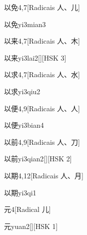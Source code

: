 \begin{entry}{以免}{4,7}[Radicais ⼈、⼉]
  \begin{phonetics}{以免}{yi3mian3}
  \end{phonetics}
\end{entry}

\begin{entry}{以来}{4,7}[Radicais ⼈、⽊]
  \begin{phonetics}{以来}{yi3lai2}[][HSK 3]
  \end{phonetics}
\end{entry}

\begin{entry}{以求}{4,7}[Radicais ⼈、⽔]
  \begin{phonetics}{以求}{yi3qiu2}
  \end{phonetics}
\end{entry}

\begin{entry}{以便}{4,9}[Radicais ⼈、⼈]
  \begin{phonetics}{以便}{yi3bian4}
  \end{phonetics}
\end{entry}

\begin{entry}{以前}{4,9}[Radicais ⼈、⼑]
  \begin{phonetics}{以前}{yi3qian2}[][HSK 2]
  \end{phonetics}
\end{entry}

\begin{entry}{以期}{4,12}[Radicais ⼈、⽉]
  \begin{phonetics}{以期}{yi3qi1}
  \end{phonetics}
\end{entry}

\begin{entry}{元}{4}[Radical ⼉]
  \begin{phonetics}{元}{yuan2}[][HSK 1]
  \end{phonetics}
\end{entry}

